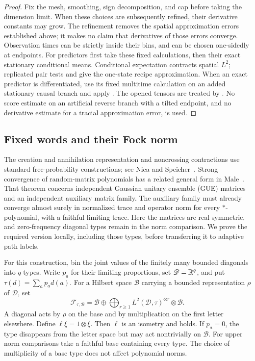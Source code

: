 \begin{proof}
Fix the mesh, smoothing, sign decomposition, and cap before taking
the dimension limit.  When these choices are subsequently refined,
their derivative constants may grow.  The refinement removes the
spatial approximation errors established above; it makes no claim
that derivatives of those errors converge.  Observation times can
be strictly inside their bins, and can be chosen one-sidedly at
endpoints.
For predictors first take these fixed calculations, then their exact
stationary conditional means.  Conditional expectation contracts
spatial $L^2$; replicated pair tests and
 give the one-state recipe approximation.
When an exact predictor is differentiated, use its fixed multitime
calculation on an added stationary causal branch and apply
.  The opened tensors are treated
by .  No score estimate on an
artificial reverse branch with a tilted endpoint, and no derivative
estimate for a tracial approximation error, is used.
\end{proof}

\subsection{Fixed words and their Fock norm}

The creation and annihilation representation and noncrossing contractions
use standard free-probability constructions; see
Nica and Speicher~\cite[Lectures~7 and~22]{NicaSpeicher2006}.
Strong convergence of random-matrix polynomials has a related general
form in Male~\cite[Theorem~1.6]{Male2010}.  That theorem concerns
independent Gaussian unitary ensemble (GUE) matrices and an independent
auxiliary matrix family.  The auxiliary family must already converge
almost surely in normalized trace and operator norm for every
$*$-polynomial, with a faithful limiting trace.  Here the matrices are
real symmetric, and zero-frequency diagonal types remain in the norm
comparison.  We prove the required version locally, including those
types, before transferring it to adaptive path labels.

For this construction, bin the joint values of the finitely many bounded
diagonals into $q$ types.  Write $p_a$ for their limiting proportions,
set $\mathscr D=\mathbb R^q$, and put $\tau(d)=\sum_ap_ad(a)$.
For a Hilbert space $\mathcal B$ carrying a bounded representation
$\rho$ of $\mathscr D$, set
\begin{equation}
 \mathcal F_{\tau,\mathcal B}
 =\mathcal B\oplus\bigoplus_{r\ge1}
             L^2(\mathscr D,\tau)^{\otimes r}\otimes\mathcal B.
 \label{eq:path-fock-space}
\end{equation}
A diagonal acts by $\rho$ on the base and by multiplication on the
first letter elsewhere.  Define $\ell\xi=1\otimes\xi$.
Then $\ell$ is an isometry and  holds.
If $p_a=0$, the type disappears from the letter space but may act
nontrivially on $\mathcal B$.  For upper norm comparisons take a
faithful base containing every type.  The choice of multiplicity of a
base type does not affect polynomial norms.

